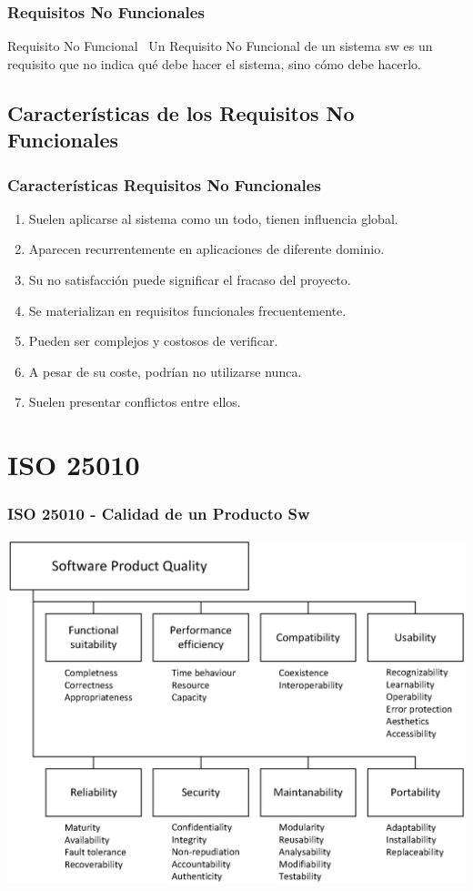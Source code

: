 \documentclass[a4paper,slidestop,xcolor=pst,dvips,blue]{beamer}
\begin{document}
\begin{frame}[c]
    \frametitle{Requisitos No Funcionales}
    \begin{block}{Requisito No Funcional~\cite{chung:1999}}
        Un \alert{Requisito No Funcional} de un sistema sw es un requisito que no indica qué debe hacer el sistema, sino cómo debe hacerlo.
    \end{block}
\end{frame}

\subsection{Características de los Requisitos No Funcionales}

\begin{frame}[c]
    \frametitle{Características Requisitos No Funcionales}
    \begin{enumerate}[<+->]
        \item Suelen aplicarse al sistema como un todo, tienen influencia global.
        \item Aparecen recurrentemente en aplicaciones de diferente dominio.
        \item Su no satisfacción puede significar el fracaso del proyecto.
        \item Se materializan en requisitos funcionales frecuentemente.
        \item Pueden ser complejos y costosos de verificar.
        \item A pesar de su coste, podrían no utilizarse nunca.
        \item Suelen presentar conflictos entre ellos.
    \end{enumerate}
\end{frame}

\section{ISO 25010}

\begin{frame}[c]
    \frametitle{ISO 25010 - Calidad de un Producto Sw}
    \begin{center}
        \includegraphics[width=0.85\linewidth]{images/iso25010/iso25010.eps}
    \end{center}
\end{frame}
\end{document}
